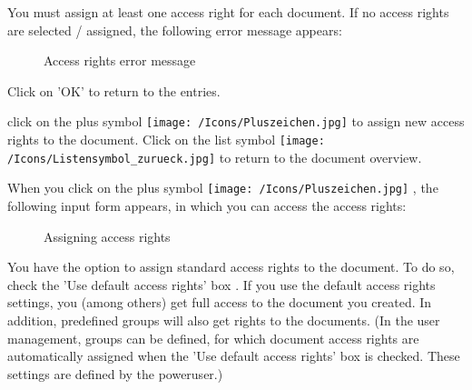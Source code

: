 You must assign at least one access right for each document. If no access rights are selected / assigned, the following error message appears:

\begin{figure}[H]
\caption{Access rights error message}
\end{figure}

Click on 'OK' to return to the entries. 

\vspace{\baselineskip}

click on the plus symbol \texttt{[image: /Icons/Pluszeichen.jpg]}  to assign new access rights to the document. Click on the list symbol \texttt{[image: /Icons/Listensymbol\_zurueck.jpg]}  to return to the document overview.

\vspace{\baselineskip}

When you click on the plus symbol \texttt{[image: /Icons/Pluszeichen.jpg]} , the following input form appears, in which you can access the access rights:

\begin{figure}[H]
\caption{Assigning access rights}
\end{figure}

You have the option to assign standard access rights to the document. To do so, check the 'Use default access rights' box . If you use the default access rights settings, you (among others) get full access to the document you created. In addition, predefined groups will also get rights to the documents. (In the user management, groups can be defined, for which document access rights are automatically assigned when the 'Use default access rights' box is checked. These settings are defined by the poweruser.)

